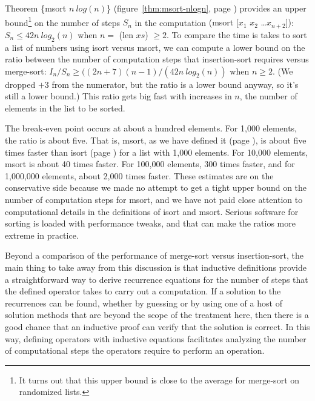 Theorem \{msort $n~log(n)$\}
(figure~\ref{thm:msort-nlogn}, page \pageref{thm:msort-nlogn}) provides
an upper bound\footnote{It
turns out that this upper bound is close to the average
for merge-sort on randomized lists.}
on the number of steps $S_n$ in the computation
\textsf{(msort [$x_1$ $x_2$ \dots $x_{n+2}$])}:
$S_{n} \leq 42n~log_2(n)$ when $n =$ (len $xs$) $\geq 2$.
To compare the time is takes to sort a
list of numbers using \textsf{isort} versus \textsf{msort},
we can compute a lower bound on the ratio between
the number of computation steps that insertion-sort requires
versus merge-sort:
$I_n/S_n \geq ((2n+7)(n-1)/(42n~log_2(n))$ when $n \geq 2$.
(We dropped $+3$ from the numerator, but the ratio is a lower bound anyway,
so it's still a lower bound.)
This ratio gets big fast with increases in $n$, the number of elements
in the list to be sorted.

The
break-even point occurs at about a hundred elements.
For 1,000 elements, the ratio is about five.
That is, \textsf{msort}, as we have defined it (page \pageref{defun:msort-copy}),
is about five times faster
than \textsf{isort} (page \pageref{defun:insert-isort})
for a list with 1,000 elements.
For 10,000 elements, \textsf{msort} is about 40 times faster.
For 100,000 elements, 300 times faster,
and for 1,000,000 elements, about 2,000 times faster.
These estimates are on the conservative side
because we made no attempt to get a tight
upper bound on the number of computation steps for \textsf{msort},
and we have not paid close attention to computational details
in the definitions of \textsf{isort} and  \textsf{msort}.
Serious software for sorting is loaded with performance tweaks,
and that can make the ratios more extreme in practice.

Beyond a comparison of the performance of merge-sort
versus insertion-sort, the main thing to take away from this discussion
is that inductive definitions provide a straightforward way to
derive recurrence equations for the number of steps that the defined operator
takes to carry out a computation.
If a solution to the recurrences can be found,
whether by guessing or by using one of a host of solution methods
that are beyond the scope of the treatment here,
then there is a good chance that an
inductive proof
can verify that the solution is correct.
In this way, defining operators with inductive equations
facilitates analyzing the number of computational
steps the operators require to perform an operation.

